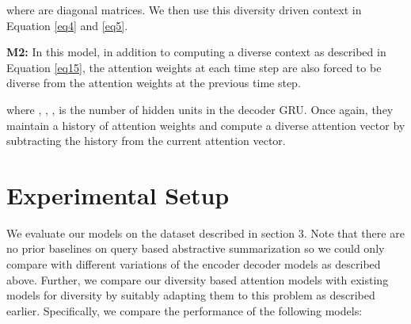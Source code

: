 \documentclass[11pt]{article}
\begin{document}
where  are diagonal matrices.
We then use this diversity driven context  in Equation \eqref{eq4} and \eqref{eq5}.

\noindent\textbf{M2:} In this model, in addition to computing a diverse context as described in Equation \eqref{eq15}, the attention weights at each time step are also forced to be diverse from the attention weights at the previous time step. 

where , , ,  is the number of hidden units in the decoder GRU. Once again, they maintain a history of attention weights and compute a diverse attention vector by subtracting the history from the current attention vector. 


\section{Experimental Setup}
We evaluate our models on the dataset described in section 3. Note that there are no prior baselines on query based abstractive summarization so we could only compare with different variations of the encoder decoder models as described above. Further, we compare our diversity based attention models with existing models for diversity by suitably adapting them to this problem as described earlier. Specifically, we compare the performance of the following models:
\end{document}
